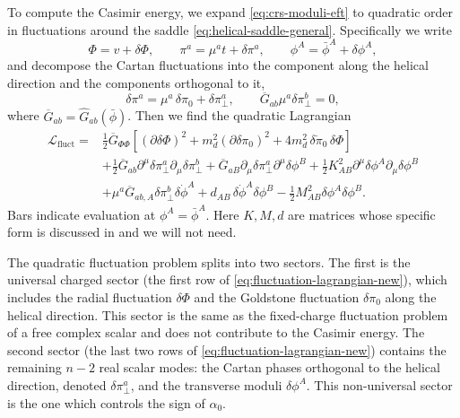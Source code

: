 \documentclass[a4paper,11pt]{article}
\begin{document}
To compute the Casimir energy, we expand \eqref{eq:crs-moduli-eft} to quadratic order in fluctuations around the saddle \eqref{eq:helical-saddle-general}. Specifically we write
\begin{equation}
    \Phi=v+\delta\Phi,
    \qquad
    \pi^a=\mu^a t+\delta\pi^a,
    \qquad
    \phi^A=\bar\phi^A+\delta\phi^A ,
\end{equation}
and decompose the Cartan fluctuations into the component along the helical direction and the components orthogonal to it,
\begin{equation}
  \delta\pi^a = \mu^a\,\delta\pi_0 + \delta\pi_\perp^a, \qquad \overline G_{ab}\mu^a\delta\pi_\perp^b=0,
\end{equation}
where $\overline G_{ab}=\widehat G_{ab}(\bar\phi)$. Then we find the quadratic Lagrangian \begin{equation}\label{eq:fluctuation-lagrangian-new}
\begin{split}
\mathcal{L}_{\text{fluct}}
=&
\frac{1}{2}\overline{G}_{\Phi\Phi}
\left[
(\partial \delta\Phi)^2
+
m_d^2 (\partial \delta\pi_0)^2
+
4 m_d^2 \,\delta\dot{\pi}_0 \,\delta\Phi
\right]
\\
&+
\frac{1}{2}\overline{G}_{ab}
\partial^\mu \delta\pi_\perp^a
\partial_\mu \delta\pi_\perp^b
+
\overline{G}_{aB}
\partial_\mu \delta\pi_\perp^a
\partial^\mu \delta\phi^B
+
\frac{1}{2}K_{AB}^2
\partial^\mu \delta\phi^A
\partial_\mu \delta\phi^B
\\
&+
\mu^a
\overline{G}_{ab,A}
\delta\pi_\perp^b
\delta\dot{\phi}^A
+
d_{AB}\,
\delta\dot{\phi}^A
\delta\phi^B
-
\frac{1}{2}M_{AB}^2
\delta\phi^A
\delta\phi^B .
\end{split}
\end{equation}
Bars indicate evaluation at $\phi^A=\bar\phi^A$. Here $K,M,d$ are matrices whose specific form is discussed in \cite{Cuomo:2024fuy} and we will not need.

The quadratic fluctuation problem splits into two sectors. The first is the universal charged sector (the first row of \eqref{eq:fluctuation-lagrangian-new}), which includes the radial fluctuation $\delta\Phi$ and the Goldstone fluctuation $\delta\pi_0$ along the helical direction. This sector is the same as the fixed-charge fluctuation problem of a free complex scalar and does not contribute to the Casimir energy. The second sector (the last two rows of \eqref{eq:fluctuation-lagrangian-new}) contains the remaining $n-2$ real scalar modes: the Cartan
phases orthogonal to the helical direction, denoted $\delta\pi_\perp^a$, and the transverse moduli $\delta\phi^A$. This non-universal sector is the one which controls the sign of $\alpha_0$. 
\end{document}
